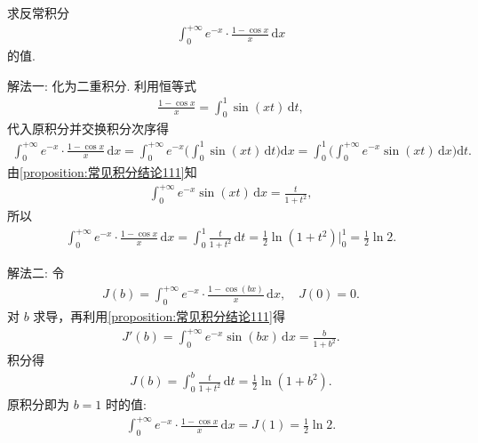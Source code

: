 \documentclass[../../main.tex]{subfiles}%
\begin{document}
\begin{example}
求反常积分
\begin{align*}
\int_0^{+\infty} e^{-x}\cdot \frac{1-\cos x}{x}\,\mathrm{d}x
\end{align*}
的值.
\end{example}
\begin{solution}

{\color{blue}解法一:} 化为二重积分.
利用恒等式
\begin{align*}
\frac{1-\cos x}{x} = \int_0^1 \sin(xt)\,\mathrm{d}t,
\end{align*}
代入原积分并交换积分次序得
\begin{align*}
\int_0^{+\infty} e^{-x}\cdot \frac{1-\cos x}{x}\,\mathrm{d}x
= \int_0^{+\infty} e^{-x} \biggl( \int_0^1 \sin(xt)\,\mathrm{d}t \biggr) \mathrm{d}x
= \int_0^1 \biggl( \int_0^{+\infty} e^{-x}\sin(xt)\,\mathrm{d}x \biggr) \mathrm{d}t.
\end{align*}
由\cref{proposition:常见积分结论111}知
\begin{align*}
\int_0^{+\infty} e^{-x}\sin(xt)\,\mathrm{d}x = \frac{t}{1+t^2},
\end{align*}
所以
\begin{align*}
\int_0^{+\infty} e^{-x}\cdot \frac{1-\cos x}{x}\,\mathrm{d}x
= \int_0^1 \frac{t}{1+t^2}\,\mathrm{d}t
= \frac{1}{2}\ln(1+t^2)\Big|_0^1
= \frac{1}{2}\ln 2.
\end{align*}

{\color{blue}解法二:}
令
\begin{align*}
J(b) = \int_0^{+\infty} e^{-x}\cdot \frac{1-\cos(bx)}{x}\,\mathrm{d}x, \quad J(0)=0.
\end{align*}
对 $b$ 求导，再利用\cref{proposition:常见积分结论111}得
\begin{align*}
J'(b) = \int_0^{+\infty} e^{-x}\sin(bx)\,\mathrm{d}x = \frac{b}{1+b^2}.
\end{align*}
积分得
\begin{align*}
J(b) = \int_0^b \frac{t}{1+t^2}\,\mathrm{d}t = \frac{1}{2}\ln(1+b^2).
\end{align*}
原积分即为 $b=1$ 时的值:
\begin{align*}
\int_0^{+\infty} e^{-x}\cdot \frac{1-\cos x}{x}\,\mathrm{d}x = J(1) = \frac{1}{2}\ln 2.
\end{align*}
\end{solution}
\end{document}
